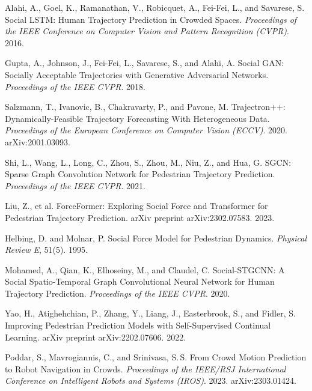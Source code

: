 \documentclass[12pt, a4paper]{article}
\begin{document}
\begin{enumerate}[label={[\arabic*]}, leftmargin=*, itemsep=4pt]

\item Alahi, A., Goel, K., Ramanathan, V., Robicquet, A., Fei-Fei, L., and Savarese, S. Social LSTM: Human Trajectory Prediction in Crowded Spaces. \textit{Proceedings of the IEEE Conference on Computer Vision and Pattern Recognition (CVPR)}. 2016.

\item Gupta, A., Johnson, J., Fei-Fei, L., Savarese, S., and Alahi, A. Social GAN: Socially Acceptable Trajectories with Generative Adversarial Networks. \textit{Proceedings of the IEEE CVPR}. 2018.

\item Salzmann, T., Ivanovic, B., Chakravarty, P., and Pavone, M. Trajectron++: Dynamically-Feasible Trajectory Forecasting With Heterogeneous Data. \textit{Proceedings of the European Conference on Computer Vision (ECCV)}. 2020. arXiv:2001.03093.

\item Shi, L., Wang, L., Long, C., Zhou, S., Zhou, M., Niu, Z., and Hua, G. SGCN: Sparse Graph Convolution Network for Pedestrian Trajectory Prediction. \textit{Proceedings of the IEEE CVPR}. 2021.

\item Liu, Z., et al. ForceFormer: Exploring Social Force and Transformer for Pedestrian Trajectory Prediction. arXiv preprint arXiv:2302.07583. 2023.

\item Helbing, D. and Molnar, P. Social Force Model for Pedestrian Dynamics. \textit{Physical Review E}, 51(5). 1995.

\item Mohamed, A., Qian, K., Elhoseiny, M., and Claudel, C. Social-STGCNN: A Social Spatio-Temporal Graph Convolutional Neural Network for Human Trajectory Prediction. \textit{Proceedings of the IEEE CVPR}. 2020.

\item Yao, H., Atighehchian, P., Zhang, Y., Liang, J., Easterbrook, S., and Fidler, S. Improving Pedestrian Prediction Models with Self-Supervised Continual Learning. arXiv preprint arXiv:2202.07606. 2022.

\item Poddar, S., Mavrogiannis, C., and Srinivasa, S.\,S. From Crowd Motion Prediction to Robot Navigation in Crowds. \textit{Proceedings of the IEEE/RSJ International Conference on Intelligent Robots and Systems (IROS)}. 2023. arXiv:2303.01424.


\end{enumerate}
\end{document}
